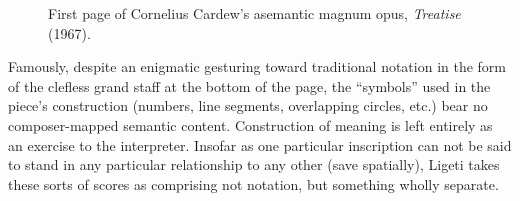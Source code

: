             \begin{figure} 
                \centering
                \captionsetup{width=.5\textwidth}
                \caption[First page of Cornelius Cardew's asemantic magnum opus, \textit{Treatise} (1967).]{First page of Cornelius Cardew's asemantic magnum opus, \textit{Treatise} (1967).\footnotemark}
                \label{fig:Treatise1}
            \end{figure}

    Famously, despite an enigmatic gesturing toward traditional notation in the form of the clefless grand staff at the bottom of the page, the ``symbols'' used in the piece's construction (numbers, line segments, overlapping circles, etc.) bear no composer-mapped semantic content. Construction of meaning is left entirely as an exercise to the interpreter. Insofar as one particular inscription can not be said to stand in any particular relationship to any other (save spatially), Ligeti takes these sorts of scores as comprising not notation, but something wholly separate.

